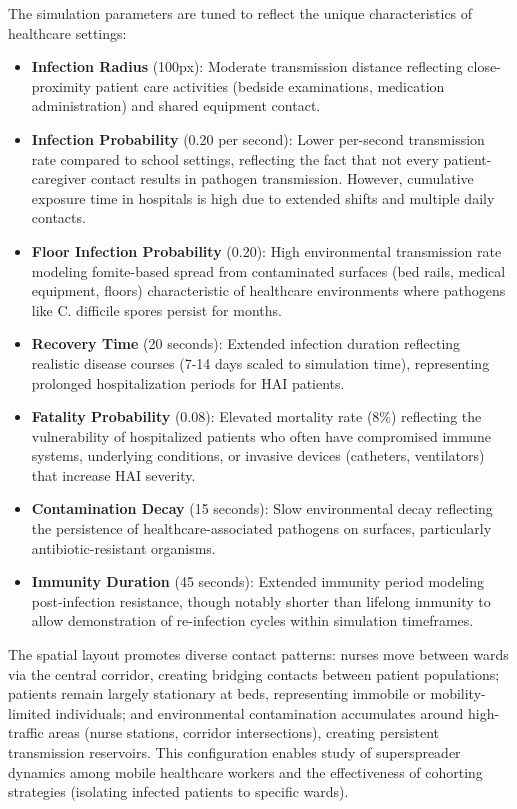 The simulation parameters are tuned to reflect the unique characteristics of healthcare settings:

\begin{itemize}
    \item \textbf{Infection Radius} (100px): Moderate transmission distance reflecting close-proximity patient care activities (bedside examinations, medication administration) and shared equipment contact.
    
    \item \textbf{Infection Probability} (0.20 per second): Lower per-second transmission rate compared to school settings, reflecting the fact that not every patient-caregiver contact results in pathogen transmission. However, cumulative exposure time in hospitals is high due to extended shifts and multiple daily contacts.
    
    \item \textbf{Floor Infection Probability} (0.20): High environmental transmission rate modeling fomite-based spread from contaminated surfaces (bed rails, medical equipment, floors) characteristic of healthcare environments where pathogens like C. difficile spores persist for months.
    
    \item \textbf{Recovery Time} (20 seconds): Extended infection duration reflecting realistic disease courses (7-14 days scaled to simulation time), representing prolonged hospitalization periods for HAI patients.
    
    \item \textbf{Fatality Probability} (0.08): Elevated mortality rate (8\%) reflecting the vulnerability of hospitalized patients who often have compromised immune systems, underlying conditions, or invasive devices (catheters, ventilators) that increase HAI severity.
    
    \item \textbf{Contamination Decay} (15 seconds): Slow environmental decay reflecting the persistence of healthcare-associated pathogens on surfaces, particularly antibiotic-resistant organisms.
    
    \item \textbf{Immunity Duration} (45 seconds): Extended immunity period modeling post-infection resistance, though notably shorter than lifelong immunity to allow demonstration of re-infection cycles within simulation timeframes.
\end{itemize}

The spatial layout promotes diverse contact patterns: nurses move between wards via the central corridor, creating bridging contacts between patient populations; patients remain largely stationary at beds, representing immobile or mobility-limited individuals; and environmental contamination accumulates around high-traffic areas (nurse stations, corridor intersections), creating persistent transmission reservoirs. This configuration enables study of superspreader dynamics among mobile healthcare workers and the effectiveness of cohorting strategies (isolating infected patients to specific wards).

